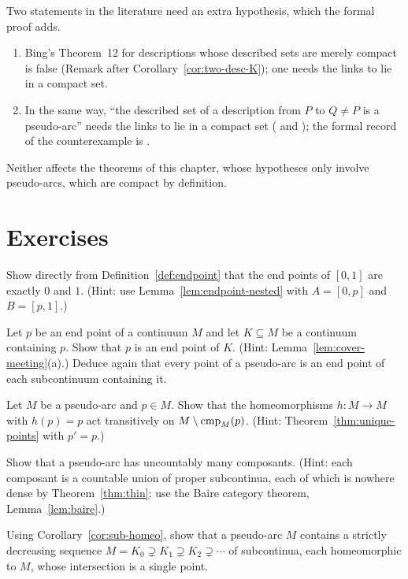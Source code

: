 \begin{remark}
Two statements in the literature need an extra hypothesis, which the formal proof adds.
\begin{enumerate}[label=(\alph*)]
\item Bing's Theorem~12 for descriptions whose described sets are merely compact is false
(Remark after Corollary~\ref{cor:two-desc-K}); one needs the links to lie in a compact set.
\item In the same way, ``the described set of a description from $P$ to $Q\ne P$ is a pseudo-arc''
needs the links to lie in a compact set ( and ); the formal
record of the counterexample is .
\end{enumerate}
Neither affects the theorems of this chapter, whose hypotheses only involve pseudo-arcs, which
are compact by definition.
\end{remark}

\section*{Exercises}

\begin{exercise}\label{ex:arc-endpoints}
Show directly from Definition~\ref{def:endpoint} that the end points of $[0,1]$ are exactly $0$
and $1$. (Hint: use Lemma~\ref{lem:endpoint-nested} with $A=[0,p]$ and $B=[p,1]$.)
\end{exercise}

\begin{exercise}
Let $p$ be an end point of a continuum $M$ and let $K\subseteq M$ be a continuum containing $p$. Show
that $p$ is an end point of $K$. (Hint: Lemma~\ref{lem:cover-meeting}(a).) Deduce again that every
point of a pseudo-arc is an end point of each subcontinuum containing it.
\end{exercise}

\begin{exercise}
Let $M$ be a pseudo-arc and $p\in M$. Show that the homeomorphisms $h\colon M\to M$ with $h(p)=p$
act transitively on $M\setminus\operatorname{cmp}_{M}(p)$. (Hint: Theorem~\ref{thm:unique-points} with
$p'=p$.)
\end{exercise}

\begin{exercise}
Show that a pseudo-arc has uncountably many composants. (Hint: each composant is a countable
union of proper subcontinua, each of which is nowhere dense by Theorem~\ref{thm:thin}; use the
Baire category theorem, Lemma~\ref{lem:baire}.)
\end{exercise}

\begin{exercise}
Using Corollary~\ref{cor:sub-homeo}, show that a pseudo-arc $M$ contains a strictly decreasing
sequence $M=K_0\supsetneq K_1\supsetneq K_2\supsetneq\cdots$ of subcontinua, each homeomorphic to
$M$, whose intersection is a single point.
\end{exercise}
